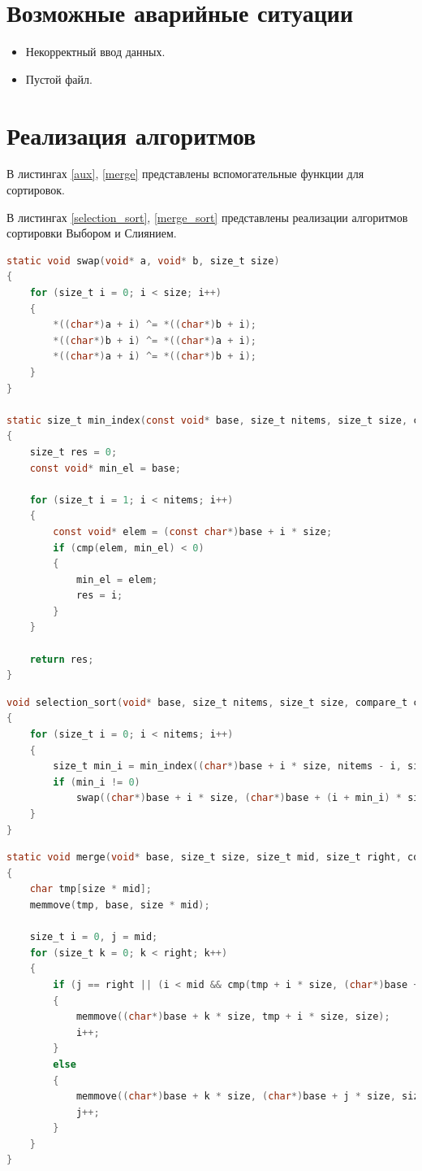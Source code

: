 \section{Возможные аварийные ситуации}
\begin{itemize}
	\item Некорректный ввод данных.
	\item Пустой файл.
\end{itemize}

\section{Реализация алгоритмов}

В листингах \ref{aux}, \ref{merge} представлены вспомогательные функции для сортировок.

В листингах \ref{selection_sort}, \ref{merge_sort} представлены реализации алгоритмов сортировки Выбором и Слиянием.

\begin{lstlisting}[label=aux,language=C,caption=Вспомогательные функции]
static void swap(void* a, void* b, size_t size)
{
	for (size_t i = 0; i < size; i++)
	{
		*((char*)a + i) ^= *((char*)b + i);
		*((char*)b + i) ^= *((char*)a + i);
		*((char*)a + i) ^= *((char*)b + i);
	}
}

static size_t min_index(const void* base, size_t nitems, size_t size, compare_t cmp)
{
	size_t res = 0;
	const void* min_el = base;
	
	for (size_t i = 1; i < nitems; i++)
	{
		const void* elem = (const char*)base + i * size;
		if (cmp(elem, min_el) < 0)
		{
			min_el = elem;
			res = i;
		}
	}
	
	return res;
}
\end{lstlisting}

\begin{lstlisting}[label=selection_sort,language=C,caption=Сортировка выбором]
void selection_sort(void* base, size_t nitems, size_t size, compare_t cmp)
{
	for (size_t i = 0; i < nitems; i++)
	{
		size_t min_i = min_index((char*)base + i * size, nitems - i, size, cmp);
		if (min_i != 0)
			swap((char*)base + i * size, (char*)base + (i + min_i) * size, size);
	}
}
\end{lstlisting}

\begin{lstlisting}[label=merge,language=C,caption=Слияние двух массивов]
static void merge(void* base, size_t size, size_t mid, size_t right, compare_t cmp) 
{
	char tmp[size * mid];
	memmove(tmp, base, size * mid);
	
	size_t i = 0, j = mid;
	for (size_t k = 0; k < right; k++)
	{
		if (j == right || (i < mid && cmp(tmp + i * size, (char*)base + j * size) < 0))
		{
			memmove((char*)base + k * size, tmp + i * size, size);
			i++;
		}
		else
		{
			memmove((char*)base + k * size, (char*)base + j * size, size);
			j++;
		}
	}
}
\end{lstlisting}

